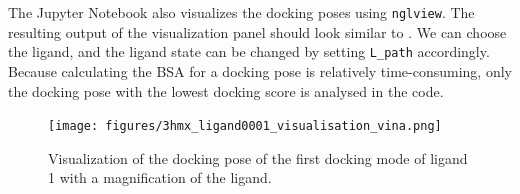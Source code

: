 \documentclass[9pt,tutorial]{livecoms}
\newcommand{\code}[1]{\colorbox{light-gray}{\texttt{#1}}}
\begin{document}
The Jupyter Notebook also visualizes the docking poses using \code{nglview}. The resulting output of the visualization panel should look similar to . We can choose the ligand, and the ligand state can be changed by setting \code{L\_path} accordingly. Because calculating the BSA for a docking pose is relatively time-consuming, only the docking pose with the lowest docking score is analysed in the code.

\begin{figure}[H]
\centering
\texttt{[image: figures/3hmx\_ligand0001\_visualisation\_vina.png]}
\caption{Visualization of the docking pose of the first docking mode of ligand 1 with a magnification of the ligand.}
\label{fig:3hmx_ligand0001_visualisation_vina}
\end{figure}
\end{document}
